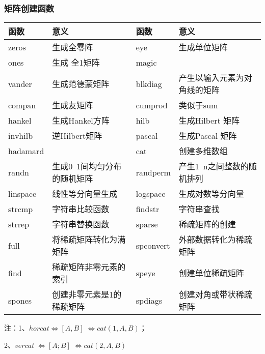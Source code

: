        \subsubsection{矩阵创建函数}
            \par
            \begin{table}[H]
            \begin{tabularx}{\textwidth}{lXlX}%
            \toprule
            函数 & 意义&函数 & 意义\\
            \midrule
            zeros &生成全零阵&eye  &生成单位矩阵 \\
             ones&生成 全1矩阵 &magic  &{}\\
            vander  &生成范德蒙矩阵&blkdiag& 产生以输入元素为对角线的矩阵\\
            compan& 生成友矩阵&cumprod &类似于sum\\
            hankel  &生成Hankel方阵&hilb  &生成Hilbert 矩阵\\
            invhilb&  逆Hilbert矩阵& pascal  &生成Pascal 矩阵\\
            hadamard  &{}&cat &创建多维数组\\
            randn &生成0~1间均匀分布的随机矩阵 &randperm& 产生1~n之间整数的随机排列\\
            linspace  &线性等分向量生成 &logspace & 生成对数等分向量\\
            strcmp  &字符串比较函数&findstr  &字符串查找\\
            strrep  &字符串替换函数 &sparse  &稀疏矩阵的创建\\
            full  &将稀疏矩阵转化为满矩阵& spconvert&  外部数据转化为稀疏矩阵\\
            find  &稀疏矩阵非零元素的索引& speye &创建单位稀疏矩阵\\
            spones  &创建非零元素是1的稀疏矩阵 &spdiags &创建对角或带状稀疏矩阵\\
            \bottomrule
            \end{tabularx}
            \end{table}
            \noindent
            注：1、$horcat \Leftrightarrow [A, B] \Leftrightarrow cat(1, A, B)$；
            \par
            2、$vercat \Leftrightarrow [A; B] \Leftrightarrow cat(2, A, B)$
